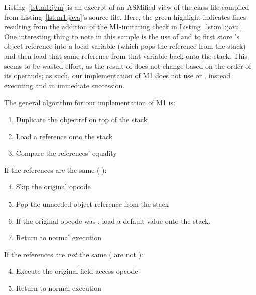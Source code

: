 Listing~\ref{lst:m1:jvm} is an excerpt of an ASMified view of the class file compiled from Listing~\ref{lst:m1:java}'s source file.
Here, the green highlight indicates lines resulting from the addition of the M1-imitating  check in Listing~\ref{lst:m1:java}.
One interesting thing to note in this sample is the use of  and  to first store 's object reference into a local variable (which pops the reference from the stack) and then load that same reference from that variable back onto the stack.
This seems to be wasted effort, as the result of  does not change based on the order of its operands;
as such, our implementation of M1 does not use  or , instead executing  and  in immediate succession.

The general algorithm for our implementation of M1 is:
\begin{enumerate}
\item
  Duplicate the objectref on top of the stack
\item
  Load a  reference onto the stack
\item
  Compare the references' equality
\end{enumerate}
\begin{minipage}[t]{0.45\linewidth}
  If the references are the same (\ie{} ):
  \begin{enumerate}[%
    leftmargin=*,%
    label={(\arabic*a)}
    ]
    \setcounter{enumi}{3}
  \item
    Skip the original opcode
  \item
    Pop the unneeded object reference from the stack
  \item\label{itm:m1:load default}
    If the original opcode was , load a default value onto the stack.
  \item
    Return to normal execution
  \end{enumerate}
\end{minipage}
\hfill\vline\hfill
\begin{minipage}[t]{0.5\linewidth}
  If the references are \textit{not} the same (\ie{} are not ):
  \begin{enumerate}[%
    leftmargin=*,%
    label={(\arabic*b)}
    ]
    \setcounter{enumi}{3}
  \item\label{itm:m1:execute original}
    Execute the original field access opcode
  \item\label{itm:m1:return}
    Return to normal execution
  \end{enumerate}
\end{minipage}

